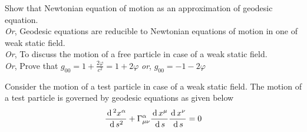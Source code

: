 \documentclass[../main-sheet.tex]{subfiles}
\begin{document}
\begin{prob}
    Show that Newtonian equation of motion as an approximation of geodesic equation.\\
    \emph{Or}, Geodesic equations are reducible to Newtonian equations of motion in one of weak static field.\\
    \emph{Or}, To discuss the motion of a free particle in case of a weak static field.\\
    \emph{Or}, Prove that \(g_{00}= 1+ \frac{2\varphi}{c^2}= 1+ 2\varphi\)
    \emph{or},
    \(g_{00}= -1- 2\varphi\)
\end{prob}
\begin{soln}
    Consider the motion of a test particle in case of a weak static field. The motion of a test particle is governed by geodesic equations as given below
    \begin{equation}
        \frac{\,\mathrm{d}\,^2 x^\alpha}{\,\mathrm{d}\, s^2}+ \Gamma^\alpha_{\mu\nu}\frac{\,\mathrm{d}\, x^\mu}{\,\mathrm{d}\, s}\frac{\,\mathrm{d}\, x^\nu}{\,\mathrm{d}\, s}=0
        \label{eq:2.1}
    \end{equation}
\end{soln}
\end{document}
